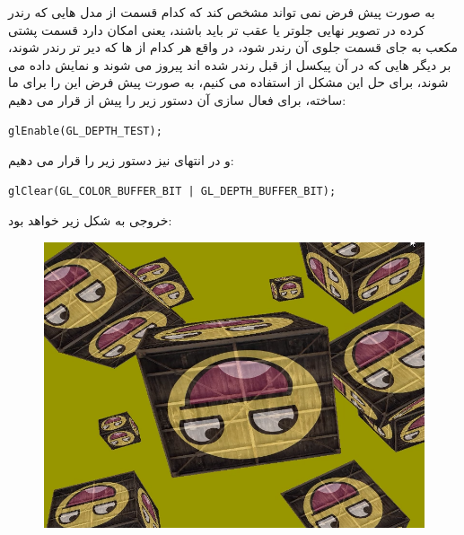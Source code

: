 \documentclass[a4paper, 12pt]{book}
\newcommand{\lrit}[1]{\lr{\textit{#1}}}
\begin{document}
    به صورت پیش فرض  نمی تواند مشخص کند که کدام قسمت از مدل هایی که رندر کرده در تصویر نهایی جلوتر یا عقب تر باید باشند، یعنی امکان دارد قسمت پشتی مکعب به جای قسمت جلوی آن رندر شود، در واقع هر کدام از  ها که دیر تر رندر شوند، بر دیگر  هایی که در آن پیکسل از قبل رندر شده اند پیروز می شوند و نمایش داده می شوند، برای حل این مشکل از  استفاده می کنیم،  به صورت پیش فرض این  را برای ما ساخته، برای فعال سازی آن دستور زیر را پیش از  قرار می دهیم:
    
    \begin{LTR}
    \small
        \begin{lstlisting}[style=C++Style,caption=\lrit{enabling depth buffer}]
glEnable(GL_DEPTH_TEST);
        \end{lstlisting}
    \end{LTR}
    \normalsize
    \vspace*{0.3cm}
    
    \newpage
    و در انتهای  نیز دستور زیر را قرار می دهیم:
    
        \begin{LTR}
    \small
        \begin{lstlisting}[style=C++Style,caption=\lrit{clearing depth buffer for next frame}]
glClear(GL_COLOR_BUFFER_BIT | GL_DEPTH_BUFFER_BIT);
        \end{lstlisting}
    \end{LTR}
    \normalsize
    \vspace*{0.3cm}
    
    خروجی به شکل زیر خواهد بود:
    \begin{figure}[ht]
    \centering
    \href{https://github.com/devprofile98/shm}{
        \includegraphics[width=13cm]{images/3d.png}
    }
    \caption{}
    \label{fig:my_label}
\end{figure}
\end{document}
